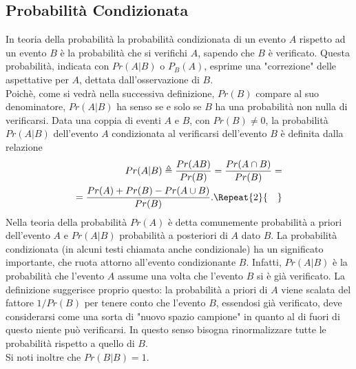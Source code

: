 \documentclass[12pt,oneside,openany]{memoir}
\numberwithin{equation}{subsection}
\newcommand{\quads}[1]{\Repeat{#1}{\quad}}
\begin{document}
\subsection{Probabilit\`a Condizionata}
In teoria della probabilit\`a la probabilit\`a condizionata di un evento $A$
rispetto ad un evento $B$ \`e la probabilit\`a che si verifichi $A$, sapendo che
$B$ \`e verificato. Questa probabilit\`a, indicata con $Pr(A | B)$ o $P_{B}(A)$,
esprime una "correzione" delle aspettative per $A$, dettata dall'osservazione di
$B$.\\
Poich\`e, come si vedr\`a nella successiva definizione, $Pr(B)$ compare al
suo denominatore, $Pr(A | B)$ ha senso se e solo se $B$ ha una probabilit\`a non
nulla di verificarsi.
\bigbreak
Data una coppia di eventi $A$ e $B$, con $Pr(B) \neq 0$, la probabilit\`a
$Pr(A|B)$ dell'evento $A$ condizionata al verificarsi dell'evento $B$ \`e
definita dalla relazione
\begin{equation}
    \begin{split}
        Pr(A | B) \triangleq \frac{Pr(AB)}{Pr(B)} = \frac{Pr(A \cap B)}{Pr(B)} =
        \\
        = \frac{Pr(A) + Pr(B) - Pr(A \cup B)}{Pr(B)}.
        \quads{2}
    \end{split}
\end{equation}
\bigbreak
Nella teoria della probabilit\`a $Pr(A)$ \`e detta comunemente probabilit\`a a
priori dell'evento $A$ e $Pr(A | B)$ probabilit\`a a posteriori di $A$ dato $B$.
La probabilit\`a condizionata (in alcuni testi chiamata anche condizionale) ha
un significato importante, che ruota attorno all'evento condizionante $B$.
Infatti, $Pr(A | B)$ \`e la probabilit\`a che l'evento $A$ assume una volta che
l'evento $B$ si \`e gi\`a verificato. La definizione suggerisce proprio questo:
la probabilit\`a a priori di $A$ viene scalata del fattore $1/Pr(B)$ per tenere
conto che l'evento $B$, essendosi gi\`a verificato, deve considerarsi come una
sorta di "nuovo spazio campione" in quanto al di fuori di questo niente pu\`o
verificarsi. In questo senso bisogna rinormalizzare tutte le probabilit\`a
rispetto a quello di $B$.\\
Si noti inoltre che $Pr(B | B) = 1$.

\end{document}
